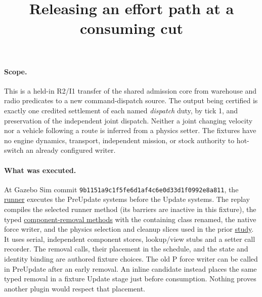 \documentclass{article}
\title{Releasing an effort path at a consuming cut}
\author{}
\date{}
\begin{document}
\maketitle
\paragraph{Scope.}
This is a held-in R2/I1 transfer of the shared admission core from
warehouse and radio predicates to a new command-dispatch source. The
output being certified is exactly one credited settlement of each
named \emph{dispatch} duty, by tick 1, and preservation of the
independent joint dispatch. Neither a joint changing velocity nor a
vehicle following a route is inferred from a physics setter. The
fixtures have no engine dynamics, transport, independent mission,
or stock authority to hot-switch an already configured writer.

\paragraph{What was executed.}
At Gazebo Sim commit
\texttt{9b1151a9c1f5fe6d1af4c6e0d33d1f0992e8a811}, the
\href{https://github.com/gazebosim/gz-sim/blob/9b1151a9c1f5fe6d1af4c6e0d33d1f0992e8a811/src/SimulationRunner.cc}{runner}
executes the PreUpdate systems before the Update systems.
The replay compiles the selected runner method (its barriers are inactive
in this fixture), the typed
\href{https://github.com/gazebosim/gz-sim/blob/9b1151a9c1f5fe6d1af4c6e0d33d1f0992e8a811/src/EntityComponentManager.cc}{component-removal methods}
with the containing class renamed, the native force writer, and the
physics selection and cleanup slices used in the prior
\href{https://github.com/eternal-november/eos-research-programmes/pull/794}{study}.
It uses serial, independent component stores, lookup/view stubs and
a setter call recorder. The removal calls, their placement in the
schedule, and the state and identity binding are authored fixture
choices. The old P force writer can be called in PreUpdate after
an early removal. An inline candidate instead places the same
typed removal in a fixture Update stage just before consumption.
Nothing proves another plugin would respect that placement.
\end{document}

